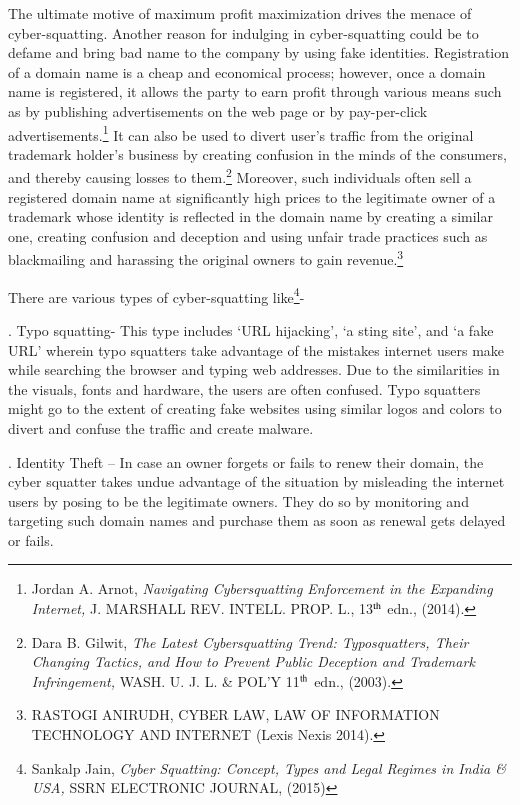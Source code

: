 \begin{multicols}{2}
\vspace{-.1cm}
\noi
The ultimate motive of maximum profit maximization drives the menace of cyber-squatting.
Another reason for indulging in cyber-squatting could be to defame and bring bad name to
the company by using fake identities. Registration of a domain name is a cheap and
economical process; however, once a domain name is registered, it allows the party to earn
profit through various means such as by publishing advertisements on the web page or by
pay-per-click advertisements.\footnote{Jordan A. Arnot, \textit{Navigating Cybersquatting Enforcement in the Expanding Internet,} J. MARSHALL REV. INTELL. PROP. L., 13$^{\rm th}$ edn., (2014).} It can also be used to divert user’s traffic from the original
trademark holder’s business by creating confusion in the minds of the consumers, and thereby
causing losses to them.\footnote{Dara B. Gilwit, \textit{The Latest Cybersquatting Trend: Typosquatters, Their Changing Tactics, and How to Prevent Public Deception and Trademark Infringement,} WASH. U. J. L. \& POL’Y 11$^{\rm th}$ edn., (2003).} Moreover, such individuals often sell a registered domain name at
significantly high prices to the legitimate owner of a trademark whose identity is reflected in the domain name by creating a similar one, creating confusion and deception and using unfair
trade practices such as blackmailing and harassing the original owners to gain revenue.\footnote{RASTOGI ANIRUDH, CYBER LAW, LAW OF INFORMATION TECHNOLOGY AND INTERNET (Lexis Nexis 2014).}

\vspace{-.1cm}
\noi
There are various types of cyber-squatting like\footnote{Sankalp Jain, \textit{Cyber Squatting: Concept, Types and Legal Regimes in India \& USA,} SSRN ELECTRONIC JOURNAL, (2015)}-

\vspace{-.1cm}

. Typo squatting- This type includes ‘URL hijacking’, ‘a sting site’, and ‘a fake URL’
wherein typo squatters take advantage of the mistakes internet users make while searching
the browser and typing web addresses. Due to the similarities in the visuals, fonts and
hardware, the users are often confused. Typo squatters might go to the extent of creating fake
websites using similar logos and colors to divert and confuse the traffic and create malware.

\vspace{-.1cm}

. Identity Theft – In case an owner forgets or fails to renew their domain, the cyber squatter
takes undue advantage of the situation by misleading the internet users by posing to be the
legitimate owners. They do so by monitoring and targeting such domain names and purchase
them as soon as renewal gets delayed or fails.


\end{multicols}
